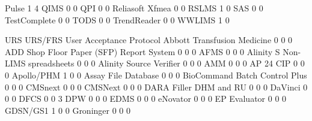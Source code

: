 \documentclass{article}
\begin{document}
\begin{Schunk}
\begin{Soutput}
  Pulse                                                        1            4
  QIMS                                                         0            0
  QPI                                                          0            0
  Reliasoft Xfmea                                              0            0
  RSLMS                                                        1            0
  SAS                                                          0            0
  TestComplete                                                 0            0
  TODS                                                         0            0
  TrendReader                                                  0            0
  WWLIMS                                                       1            0
                                          
                                           URS URS/FRS User Acceptance Protocol
  Abbott Transfusion Medicine                0       0                        0
  ADD Shop Floor Paper (SFP) Report System   0       0                        0
  AFMS                                       0       0                        0
  Alinity S Non-LIMS spreadsheets            0       0                        0
  Alinity Source Verifier                    0       0                        0
  AMM                                        0       0                        0
  AP 24 CIP                                  0       0                        0
  Apollo/PHM                                 1       0                        0
  Assay File Database                        0       0                        0
  BioCommand Batch Control Plus              0       0                        0
  CMSnext                                    0       0                        0
  CMSNext                                    0       0                        0
  DARA Filler DHM and RU                     0       0                        0
  DaVinci                                    0       0                        0
  DFCS                                       0       0                        3
  DPW                                        0       0                        0
  EDMS                                       0       0                        0
  eNovator                                   0       0                        0
  EP Evaluator                               0       0                        0
  GDSN/GS1                                   1       0                        0
  Groninger                                  0       0                        0

\end{Soutput}
\end{Schunk}
\end{document}
